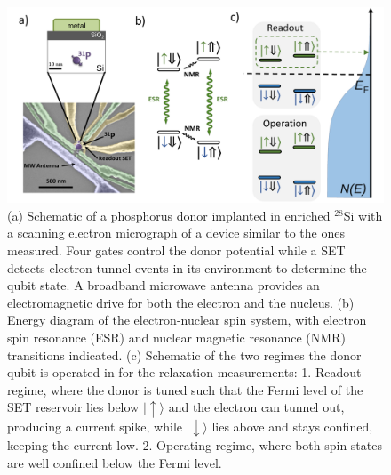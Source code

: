 \documentclass[%
 reprint,
 amsmath,amssymb,
 aps,
]{revtex4-1}
\newcommand {\ket} [1] {|{ #1 \rangle}}
\begin{document}
\begin{figure}
\centering
\includegraphics[width=\columnwidth]{figures/fig1.pdf}
\caption{
(a) Schematic of a phosphorus donor implanted in enriched $^{28}$Si with a scanning electron micrograph of a device similar to the ones measured. Four gates control the donor potential while a SET detects electron tunnel events in its environment to determine the qubit state. A broadband microwave antenna provides an electromagnetic drive for both the electron and the nucleus. (b) Energy diagram of the electron-nuclear spin system, with electron spin resonance (ESR) and nuclear magnetic resonance (NMR) transitions indicated. (c) Schematic of the two regimes the donor qubit is operated in for the relaxation measurements: 1. Readout regime, where the donor is tuned such that the Fermi level of the SET reservoir lies below $\ket{\uparrow}$ and the electron can tunnel out, producing a current spike, while $\ket{\downarrow}$ lies above and stays confined, keeping the current low. 2. Operating regime, where both spin states are well confined below the Fermi level.
}
\label{fig:device}
\end{figure}
\end{document}
